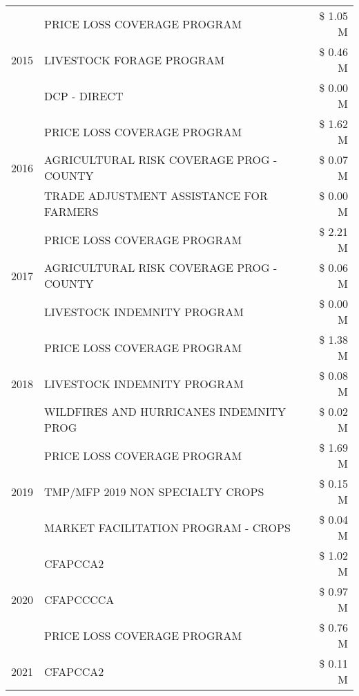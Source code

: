 \begin{tabular}{llr}
\cline{1-3}
\multirow[t]{3}{*}{2015} & PRICE LOSS COVERAGE PROGRAM & \$ 1.05 M \\
 & LIVESTOCK FORAGE PROGRAM & \$ 0.46 M \\
 & DCP - DIRECT & \$ 0.00 M \\
\cline{1-3}
\multirow[t]{3}{*}{2016} & PRICE LOSS COVERAGE PROGRAM & \$ 1.62 M \\
 & AGRICULTURAL RISK COVERAGE PROG - COUNTY & \$ 0.07 M \\
 & TRADE ADJUSTMENT ASSISTANCE FOR FARMERS & \$ 0.00 M \\
\cline{1-3}
\multirow[t]{3}{*}{2017} & PRICE LOSS COVERAGE PROGRAM & \$ 2.21 M \\
 & AGRICULTURAL RISK COVERAGE PROG - COUNTY & \$ 0.06 M \\
 & LIVESTOCK INDEMNITY PROGRAM & \$ 0.00 M \\
\cline{1-3}
\multirow[t]{3}{*}{2018} & PRICE LOSS COVERAGE PROGRAM & \$ 1.38 M \\
 & LIVESTOCK INDEMNITY PROGRAM & \$ 0.08 M \\
 & WILDFIRES AND HURRICANES INDEMNITY PROG & \$ 0.02 M \\
\cline{1-3}
\multirow[t]{3}{*}{2019} & PRICE LOSS COVERAGE PROGRAM & \$ 1.69 M \\
 & TMP/MFP 2019 NON SPECIALTY CROPS & \$ 0.15 M \\
 & MARKET FACILITATION PROGRAM - CROPS & \$ 0.04 M \\
\cline{1-3}
\multirow[t]{3}{*}{2020} & CFAPCCA2 & \$ 1.02 M \\
 & CFAPCCCCA & \$ 0.97 M \\
 & PRICE LOSS COVERAGE PROGRAM & \$ 0.76 M \\
\cline{1-3}
2021 & CFAPCCA2 & \$ 0.11 M \\
\cline{1-3}
\bottomrule
\end{tabular}
